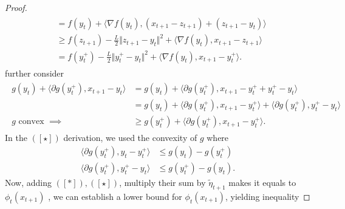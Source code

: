 \documentclass[12pt]{article}
\begin{document}
\begin{proof}
\begin{align*}
\begin{aligned}
                    &=
                    f(y_t) + \langle \nabla f(y_t), (x_{t +1} - z_{t + 1}) + (z_{t + 1} - y_t) \rangle
                    \\
                    &\ge 
                    f(z_{t + 1}) - \frac{L}{2} \Vert z_{t + 1} - y_t\Vert^2 + 
                    \langle \nabla f(y_t), x_{t +1} - z_{t + 1}\rangle
                    \\
                    &= 
                    f(y_t^+) - \frac{L}{2}\Vert y_t^+ - y_t\Vert^2
                    + \langle \nabla f(y_t), x_{t + 1} - y_t^+\rangle.     
                \end{aligned}
                \tag{$[*]$}
            \end{align*}
            further consider
            \begin{align*}
                \begin{aligned}
                    g(y_t) + \langle \partial g(y_t^+), x_{t + 1} - y_t\rangle 
                    &= g(y_t) + 
                    \langle \partial g(y_t^+), 
                    x_{t + 1} - y_t^+ + y_t^+ - y_t
                    \rangle
                    \\
                    &= g(y_t) 
                    + \langle \partial g (y_t^+),
                        x_{t + 1} - y_t^+
                    \rangle
                    + 
                    \langle 
                        \partial g(y_t^+), y_t^+ - y_t
                    \rangle
                    \\
                    g \text{ convex }\implies 
                    &\ge 
                    g(y_t^+) + 
                    \langle \partial g(y_t^+), x_{t + 1} - y_t^+\rangle. 
                \end{aligned}
                \tag{$[\star]$}
            \end{align*}
            In the $([\star])$ derivation, we used the convexity of $g$ where 
            \begin{align*}
                \langle \partial g(y_t^+), y_t - y_t^+\rangle
                &\le g(y_t) - g(y_t^+)
                \\
                \langle \partial g (y_t^+), y_t^+ - y_t \rangle
                &\le 
                g(y_t^+) - g(y_t). 
            \end{align*}
            Now, adding $([*]), ([\star])$, multiply their sum by $\tilde\eta_{t + 1}$ makes it equals to $\phi_t(x_{t +1 })$ , we can establish a lower bound for $\phi_t(x_{t + 1})$, yielding inequality 

\end{proof}
\end{document}
